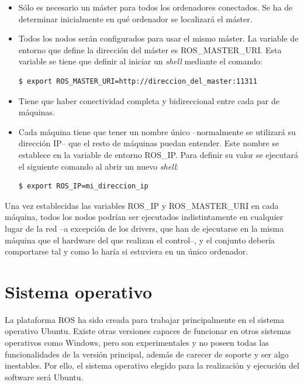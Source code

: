 \documentclass[12pt, a4paper]{report}
\begin{document}
\begin{itemize}
\item Sólo es necesario un máster para todos los ordenadores conectados. Se ha de determinar inicialmente en qué ordenador se localizará el máster.

\item Todos los nodos serán configurados para usar el mismo máster. La variable de entorno que define la dirección del máster es ROS\_MASTER\_URI. Esta variable se tiene que definir al iniciar un \textit{shell} mediante el comando:

\begin{verbatim}
$ export ROS_MASTER_URI=http://direccion_del_master:11311
\end{verbatim}

\item Tiene que haber conectividad completa y bidireccional entre cada par de máquinas.

\item Cada máquina tiene que tener un nombre único --normalmente se utilizará su dirección IP-- que el resto de máquinas puedan entender. Este nombre se establece en la variable de entorno ROS\_IP. Para definir su valor se ejecutará el siguiente comando al abrir un nuevo \textit{shell}:

\begin{verbatim}
$ export ROS_IP=mi_direccion_ip
\end{verbatim}

\end{itemize}

Una vez establecidas las variables ROS\_IP y ROS\_MASTER\_URI en cada máquina, todos los nodos podrían ser ejecutados indistintamente en cualquier lugar de la red --a excepción de los drivers, que han de ejecutarse en la misma máquina que el hardware del que realizan el control--, y el conjunto debería comportarse tal y como lo haría si estuviera en un único ordenador. 

\section{Sistema operativo}

La plataforma ROS ha sido creada para trabajar principalmente en el sistema operativo Ubuntu. Existe otras versiones capaces de funcionar en otros sistemas operativos como Windows, pero son experimentales y no poseen todas las funcionalidades de la versión principal, además de carecer de soporte y ser algo inestables. Por ello, el sistema operativo elegido para la realización y ejecución del software será Ubuntu.
\end{document}
